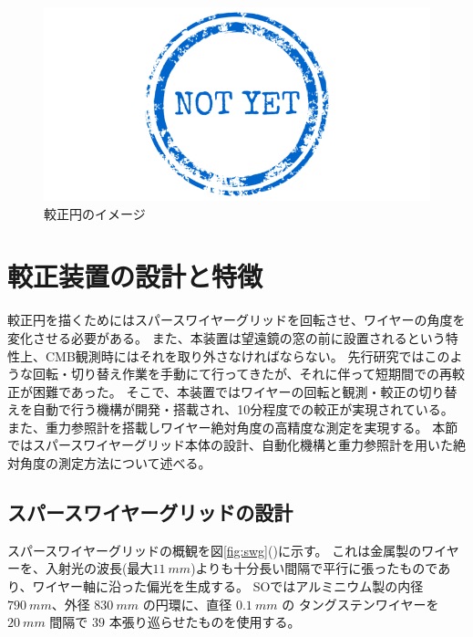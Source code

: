 \documentclass[../../main.tex]{subfiles}
\begin{document}
\begin{figure}[H]
    \centering
    \includegraphics[width=0.8\columnwidth]{draft/not-yet.png}
    \caption{較正円のイメージ}
    \label{fig:calibration_circle}
\end{figure}
\section{較正装置の設計と特徴}
較正円を描くためにはスパースワイヤーグリッドを回転させ、ワイヤーの角度を変化させる必要がある。
また、本装置は望遠鏡の窓の前に設置されるという特性上、CMB観測時にはそれを取り外さなければならない。
先行研究ではこのような回転・切り替え作業を手動にて行ってきたが、それに伴って短期間での再較正が困難であった。
そこで、本装置ではワイヤーの回転と観測・較正の切り替えを自動で行う機構が開発・搭載され、10分程度での較正が実現されている。
また、重力参照計を搭載しワイヤー絶対角度の高精度な測定を実現する。
本節ではスパースワイヤーグリッド本体の設計、自動化機構と重力参照計を用いた絶対角度の測定方法について述べる。
\subsection{スパースワイヤーグリッドの設計}
スパースワイヤーグリッドの概観を図\ref{fig:swg}()に示す。
これは金属製のワイヤーを、入射光の波長(最大$\SI{11}{mm}$)よりも十分長い間隔で平行に張ったものであり、ワイヤー軸に沿った偏光を生成する。
SOではアルミニウム製の内径$\SI{790}{mm}$、外径 $\SI{830}{mm}$ の円環に、直径 $\SI{0.1}{mm}$ の
タングステンワイヤーを $\SI{20}{mm}$ 間隔で $39$ 本張り巡らせたものを使用する\cite{swg:murata}。
\end{document}
